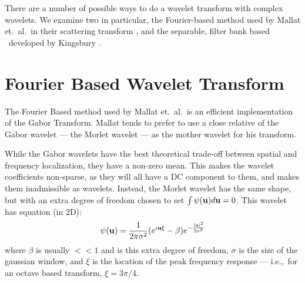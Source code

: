   There are a number of possible ways to do a wavelet transform with complex
  wavelets. We examine two in particular, the Fourier-based method used by
  Mallat et.\ al.\ in their scattering transform
  \citep{bruna_classification_2011, bruna_invariant_2013, bruna_scattering_2013,
  oyallon_generic_2013, oyallon_deep_2015, sifre_rotation_2013,
  sifre_rigid-motion_2014, sifre_rigid-motion_2014-1, sifre_scatnet_2013}, and
  the separable, filter bank based \DTCWT\ developed by Kingsbury
  \citep{kingsbury_wavelet_1997, kingsbury_dual-tree_1998,
  kingsbury_dual-tree_1998-1,  kingsbury_image_1999, kingsbury_shift_1999,
  kingsbury_dual-tree_2000, kingsbury_complex_2001, selesnick_dual-tree_2005}.

\section{Fourier Based Wavelet Transform}\label{sec:morlet_fourier}
  The Fourier Based method used by Mallat et.\ al.\ is an efficient
  implementation of the Gabor Transform. Mallat tends to prefer to use a close
  relative of the Gabor wavelet --- the Morlet wavelet --- as the mother wavelet
  for his transform. 
  
  While the Gabor wavelets have the best theoretical trade-off between spatial
  and frequency localization, they have a non-zero mean.  This makes the
  wavelet coefficients non-sparse, as they will all have a DC component to
  them, and makes them inadmissible as wavelets. Instead, the Morlet wavelet
  has the same shape, but with an extra degree of freedom chosen to set $\int
  \psi (\mathbf{u}) d\mathbf{u} =0$.  This wavelet has equation (in 2D):
  \begin{equation}
    \psi(\mathbf{u}) = \frac{1}{2\pi\sigma^2} {(e^{i\mathbf{u}\xi} - \beta)}
                     e^{-\frac{|\mathbf{u}|^2}{2\sigma^2}} 
    \label{eq:morlet}
  \end{equation}
  where $\beta$ is usually $<<1$ and is this extra degree of freedom, 
  $\sigma$ is the size of the gaussian window, and $\xi$ is the
  location of the peak frequency response --- i.e.,\ for an octave based
  transform, $\xi = 3\pi/4$.


